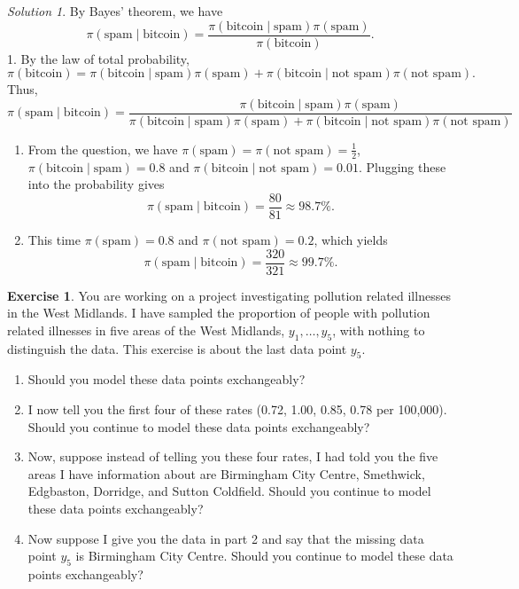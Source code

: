 \documentclass[
]{book}
\providecommand{\tightlist}{%
  \setlength{\itemsep}{0pt}\setlength{\parskip}{0pt}}
\theoremstyle{definition}
\theoremstyle{definition}
\theoremstyle{definition}
\newtheorem{exercise}{Exercise}[chapter]
\theoremstyle{definition}
\theoremstyle{remark}
\newtheorem*{solution}{Solution}
\begin{document}
\begin{solution}

By Bayes' theorem, we have
\[
 \pi(\textrm{spam} \mid \textrm{bitcoin}) = \frac{\pi(\textrm{bitcoin} \mid \textrm{spam})\pi(\textrm{spam})}{\pi(\textrm{bitcoin})}.
\]
1. By the law of total probability,
\[
\pi(\textrm{bitcoin}) = \pi(\textrm{bitcoin} \mid \textrm{spam})\pi(\textrm{spam}) + \pi(\textrm{bitcoin} \mid \textrm{not spam})\pi(\textrm{not spam}). 
\]
Thus,
\[
  \pi(\textrm{spam} \mid \textrm{bitcoin}) = \frac{\pi(\textrm{bitcoin} \mid \textrm{spam})\pi(\textrm{spam})}{\pi(\textrm{bitcoin} \mid \textrm{spam})\pi(\textrm{spam}) + \pi(\textrm{bitcoin} \mid \textrm{not spam})\pi(\textrm{not spam})}
\]

\begin{enumerate}
\def\labelenumi{\arabic{enumi}.}
\setcounter{enumi}{1}
\tightlist
\item
  From the question, we have \(\pi(\textrm{spam}) =\pi(\textrm{not spam}) = \frac{1}{2}\), \(\pi(\textrm{bitcoin} \mid \textrm{spam}) = 0.8\) and \(\pi(\textrm{bitcoin} \mid \textrm{not spam}) = 0.01\). Plugging these into the probability gives
  \[
    \pi(\textrm{spam} \mid \textrm{bitcoin}) = \frac{80}{81} \approx 98.7\%.
  \]
\item
  This time \(\pi(\textrm{spam}) = 0.8\) and \(\pi(\textrm{not spam}) = 0.2\), which yields
  \[
    \pi(\textrm{spam} \mid \textrm{bitcoin}) = \frac{320}{321} \approx 99.7\%.
  \]
\end{enumerate}

\end{solution}

\begin{exercise}

You are working on a project investigating pollution related illnesses in the West Midlands. I have sampled the proportion of people with pollution related illnesses in five areas of the West Midlands, \(y_1, \ldots, y_5\), with nothing to distinguish the data. This exercise is about the last data point \(y_5\).

\begin{enumerate}
\def\labelenumi{\arabic{enumi}.}
\tightlist
\item
  Should you model these data points exchangeably?
\item
  I now tell you the first four of these rates (0.72, 1.00, 0.85, 0.78 per 100,000). Should you continue to model these data points exchangeably?
\item
  Now, suppose instead of telling you these four rates, I had told you the five areas I have information about are Birmingham City Centre, Smethwick, Edgbaston, Dorridge, and Sutton Coldfield. Should you continue to model these data points exchangeably?
\item
  Now suppose I give you the data in part 2 and say that the missing data point \(y_5\) is Birmingham City Centre. Should you continue to model these data points exchangeably?
\end{enumerate}

\end{exercise}
\end{document}
